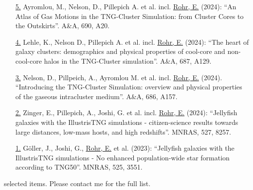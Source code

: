 \documentclass[a4paper,10pt,oneside]{article}
\begin{document}
\begin{enumerate}[wide, labelwidth=!, labelindent=-11pt, parsep=0pt]
    \item[\href{https://www.aanda.org/articles/aa/abs/2024/10/aa48612-23/aa48612-23.html}{5.}] Ayromlou, M., Nelson, D., Pillepich A. et al. incl. \underline{Rohr, E.} (2024): ``An Atlas of Gas Motions in the TNG-Cluster Simulation: from Cluster Cores to the Outskirts''. A\&A, 690, A20.
    \item[\href{https://ui.adsabs.harvard.edu/abs/2024A\%26A...687A.129L/abstract}{4.}] Lehle, K., Nelson D., Pillepich A. et al. incl. \underline{Rohr, E.} (2024): ``The heart of galaxy clusters: demographics and physical properties of cool-core and non-cool-core halos in the TNG-Cluster simulation''. A\&A, 687, A129.
    \item[\href{https://ui.adsabs.harvard.edu/abs/2024A&A...686A.157N/abstract}{3.}] Nelson, D., Pillpeich, A., Ayromlou M. et al. incl. \underline{Rohr, E.} (2024). ``Introducing the TNG-Cluster Simulation: overview and physical properties of the gaseous intracluster medium''. A\&A, 686, A157.
    \item[\href{https://ui.adsabs.harvard.edu/abs/2024MNRAS.527.8257Z/abstract}{2.}] Zinger, E., Pillepich, A., Joshi, G. et al. incl. \underline{Rohr, E.} (2024): ``Jellyfish galaxies with the IllustrisTNG simulations - citizen-science results towards large distances, low-mass hosts, and high redshifts''. MNRAS, 527, 8257.
    \item[\href{https://ui.adsabs.harvard.edu/abs/2023MNRAS.525.3551G/abstract}{1.}] G{\"o}ller, J., Joshi, G., \underline{Rohr, E.} et al. (2023): ``Jellyfish galaxies with the IllustrisTNG simulations - No enhanced population-wide star formation according to TNG50''. MNRAS, 525, 3551.
\end{enumerate}

\noindent{}

\vspace{5.5pt}

 selected items. Please contact me for the full list.
\end{document}
